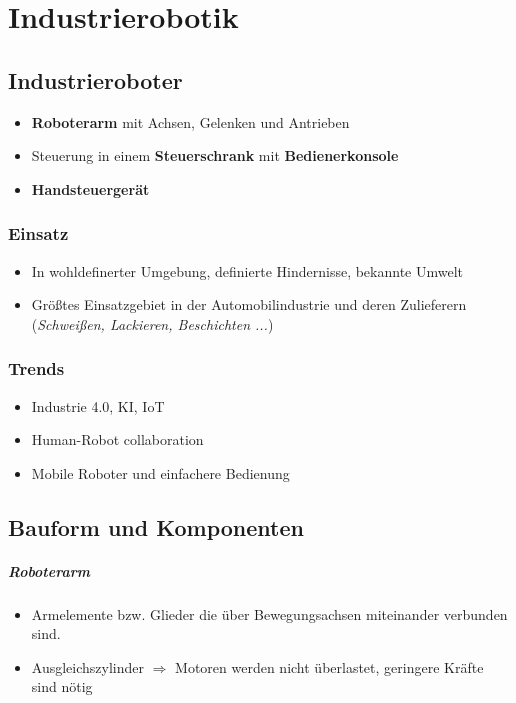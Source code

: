 \chapter{Industrierobotik}
\section{Industrieroboter}
\begin{itemize}
	\item \textbf{Roboterarm} mit Achsen, Gelenken und Antrieben
	\item Steuerung in einem \textbf{Steuerschrank} mit \textbf{Bedienerkonsole}
	\item \textbf{Handsteuergerät}
\end{itemize}

\subsection{Einsatz}
\begin{itemize}
	\item In wohldefinerter Umgebung, definierte Hindernisse, bekannte Umwelt
	\item Größtes Einsatzgebiet in der Automobilindustrie und deren Zulieferern (\textit{Schweißen, Lackieren, Beschichten ...})
\end{itemize}

\subsection{Trends}
\begin{itemize}
	\item Industrie 4.0, KI, IoT
	\item Human-Robot collaboration
	\item Mobile Roboter und einfachere Bedienung
\end{itemize}

\section{Bauform und Komponenten}
\paragraph{Roboterarm}
\begin{itemize}
	\item Armelemente bzw. Glieder die über Bewegungsachsen miteinander verbunden sind.
	\item Ausgleichszylinder $\Rightarrow$ Motoren werden nicht überlastet, geringere Kräfte sind nötig
\end{itemize}

